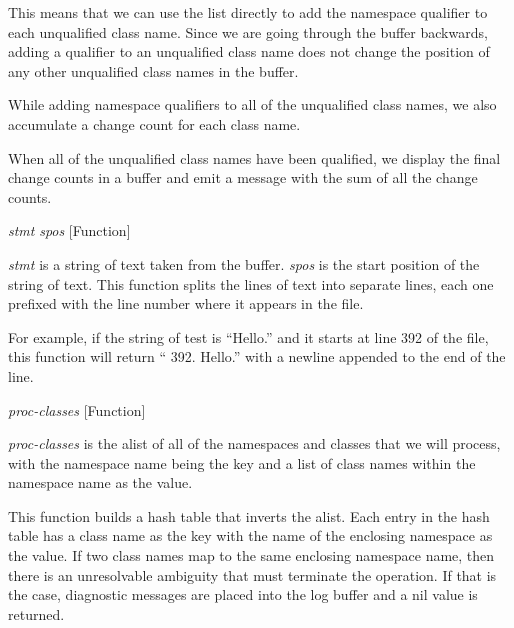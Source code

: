 \begin{doc-string}
This means that we can use the list directly to add the namespace qualifier to
each unqualified class name.  Since we are going through the buffer backwards,
adding a qualifier to an unqualified class name does not change the position of
any other unqualified class names in the buffer.

While adding namespace qualifiers to all of the unqualified class names, we also
accumulate a change count for each class name.

When all of the unqualified class names have been qualified, we display the
final change counts in a buffer and emit a message with the sum of all the
change counts.
\end{doc-string}

\vspace{1em}
\noindent
{}
\usebox{\funcname}\emph{stmt} \emph{spos}
 \hfill [Function]

\begin{doc-string}
\emph{stmt} is a string of text taken from the buffer.  \emph{spos} is the start position
of the string of text.  This function splits the lines of text into separate
lines, each one prefixed with the line number where it appears in the file.

For example, if the string of test is ``Hello.'' and it starts at line 392 of
the file, this function will return ``   392. Hello.'' with a newline appended
to the end of the line.
\end{doc-string}

\vspace{1em}
\noindent
{}
\usebox{\funcname}\emph{proc-classes}
 \hfill [Function]
\hspace*{\wd\funcname}

\begin{doc-string}
\emph{proc-classes} is the alist of all of the namespaces and classes that we will
process, with the namespace name being the key and a list of class names within the
namespace name as the value.

This function builds a hash table that inverts the
alist.  Each entry in the hash table has a class name as the key with the name
of the enclosing namespace as the value.
If two class names map to the same enclosing namespace name, then there is an
unresolvable ambiguity that must terminate the operation.  If that is the case,
diagnostic messages are placed into the log buffer and a nil value is returned.
\end{doc-string}

